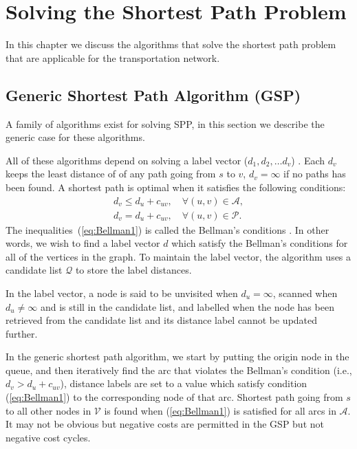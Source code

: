 \chapter{Solving the Shortest Path Problem}
\label{chapter:solvingspp}

In this chapter we discuss the algorithms
that solve the shortest path problem that are
applicable for the transportation network.

\section{Generic Shortest Path Algorithm (GSP)}

A family of algorithms exist for solving SPP,
in this section we describe the generic case for these
algorithms.

All of these algorithms depend on solving 
a label vector ($d_1, d_2,\dots d_v$) \citep{Klunder}.
Each $d_v$ keeps the least distance of of any path going from $s$ to $v$, $d_v = \infty$ if no paths has been found.
A shortest path is optimal when it satisfies the following conditions:
\begin{align}
    d_v \leq d_u + c_{uv}, \quad \forall(u,v) \in \mathcal{A}, \label{eq:Bellman1}\\
    d_v  =   d_u + c_{uv}, \quad \forall(u,v) \in \mathcal{P}.
\end{align}
The inequalities~(\ref{eq:Bellman1}) is called the Bellman's conditions \citep{Bellman}.
In other words,
we wish to find a label vector $d$ which satisfy the Bellman's conditions for all of the vertices in the graph.
To maintain the label vector, the algorithm uses a candidate list $\mathcal{Q}$ to store the label distances.

In the label vector,
a node is said to be unvisited when $d_u = \infty$,
scanned when $d_u \neq \infty$ and is still in the candidate list,
and labelled when the node has been retrieved from the candidate list and its distance label cannot be updated further.

In the generic shortest path algorithm,
we start by putting the origin node in the queue,
and then iteratively find the arc that violates the Bellman's condition (i.e., $d_v > d_u + c_{uv}$),
distance labels are set to a value which satisfy condition (\ref{eq:Bellman1}) to the corresponding node of that arc.
Shortest path going from $s$ to all other nodes in $\mathcal{V}$ is found when (\ref{eq:Bellman1}) is satisfied for all arcs in $\mathcal{A}$.
It may not be obvious but negative costs are permitted in the GSP but not negative cost cycles.

